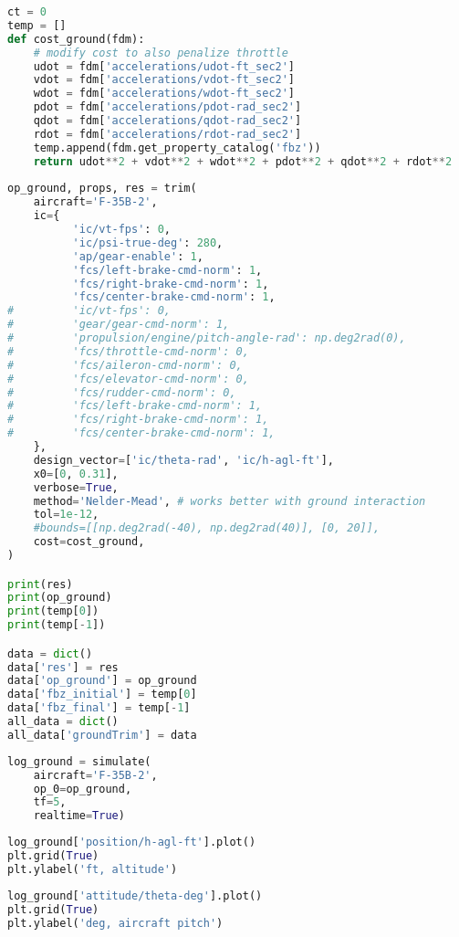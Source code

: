 \begin{lstlisting}[language=Python]
ct = 0
temp = []
def cost_ground(fdm):
    # modify cost to also penalize throttle   
    udot = fdm['accelerations/udot-ft_sec2']
    vdot = fdm['accelerations/vdot-ft_sec2']
    wdot = fdm['accelerations/wdot-ft_sec2']
    pdot = fdm['accelerations/pdot-rad_sec2']
    qdot = fdm['accelerations/qdot-rad_sec2']
    rdot = fdm['accelerations/rdot-rad_sec2']
    temp.append(fdm.get_property_catalog('fbz'))
    return udot**2 + vdot**2 + wdot**2 + pdot**2 + qdot**2 + rdot**2  
        
op_ground, props, res = trim(
    aircraft='F-35B-2',
    ic={
          'ic/vt-fps': 0,
          'ic/psi-true-deg': 280,
          'ap/gear-enable': 1,
          'fcs/left-brake-cmd-norm': 1,
          'fcs/right-brake-cmd-norm': 1,
          'fcs/center-brake-cmd-norm': 1,
#         'ic/vt-fps': 0,
#         'gear/gear-cmd-norm': 1,
#         'propulsion/engine/pitch-angle-rad': np.deg2rad(0),
#         'fcs/throttle-cmd-norm': 0,
#         'fcs/aileron-cmd-norm': 0,
#         'fcs/elevator-cmd-norm': 0,
#         'fcs/rudder-cmd-norm': 0,
#         'fcs/left-brake-cmd-norm': 1,
#         'fcs/right-brake-cmd-norm': 1,
#         'fcs/center-brake-cmd-norm': 1,
    },
    design_vector=['ic/theta-rad', 'ic/h-agl-ft'],
    x0=[0, 0.31],
    verbose=True,
    method='Nelder-Mead', # works better with ground interaction
    tol=1e-12,
    #bounds=[[np.deg2rad(-40), np.deg2rad(40)], [0, 20]],
    cost=cost_ground,
)

print(res)
print(op_ground)
print(temp[0])
print(temp[-1])

data = dict()
data['res'] = res
data['op_ground'] = op_ground
data['fbz_initial'] = temp[0]
data['fbz_final'] = temp[-1]
all_data = dict()
all_data['groundTrim'] = data
\end{lstlisting}

\begin{lstlisting}[language=Python]
log_ground = simulate(
    aircraft='F-35B-2',
    op_0=op_ground,
    tf=5,
    realtime=True)
\end{lstlisting}

\begin{lstlisting}[language=Python]
log_ground['position/h-agl-ft'].plot()
plt.grid(True)
plt.ylabel('ft, altitude')
\end{lstlisting}

\begin{lstlisting}[language=Python]
log_ground['attitude/theta-deg'].plot()
plt.grid(True)
plt.ylabel('deg, aircraft pitch')
\end{lstlisting}

